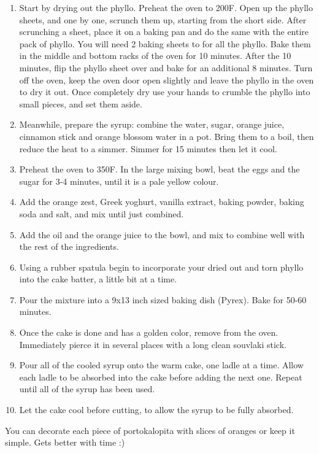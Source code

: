 \begin{enumerate}
    \item Start by drying out the phyllo. Preheat the oven to 200\degree F. Open up the phyllo sheets, and one by one, scrunch them up, starting from the short side. After scrunching a sheet, place it on a baking pan and do the same with the entire pack of phyllo. You will need 2 baking sheets to for all the phyllo. Bake them in the middle and bottom racks of the oven for 10 minutes. After the 10 minutes, flip the phyllo sheet over and bake for an additional 8 minutes. Turn off the oven, keep the oven door open slightly and leave the phyllo in the oven to dry it out. Once completely dry use your hands to crumble the phyllo into small pieces, and set them aside.
    \item Meanwhile, prepare the syrup: combine the water, sugar, orange juice, cinnamon stick and orange blossom water in a pot. Bring them to a boil, then reduce the heat to a simmer. Simmer for 15 minutes then let it cool.
    \item Preheat the oven to 350\degree F. In the large mixing bowl, beat the eggs and the sugar for 3-4 minutes, until it is a pale yellow colour.
    \item Add the orange zest, Greek yoghurt, vanilla extract, baking powder, baking soda and salt, and mix until just combined.
    \item Add the oil and the orange juice to the bowl, and mix to combine well with the rest of the ingredients.
    \item Using a rubber spatula begin to incorporate your dried out and torn phyllo into the cake batter, a little bit at a time.
    \item Pour the mixture into a 9x13 inch sized baking dish (Pyrex). Bake for 50-60 minutes.
    \item Once the cake is done and has a golden color, remove from the oven. Immediately pierce it in several places with a long clean souvlaki stick. \item Pour all of the cooled syrup onto the warm cake, one ladle at a time. Allow each ladle to be absorbed into the cake before adding the next one. Repeat until all of the syrup has been used.
    \item Let the cake cool before cutting, to allow the syrup to be fully absorbed.
\end{enumerate}


You can decorate each piece of portokalopita with slices of oranges or keep it simple. Gets better with time :)



